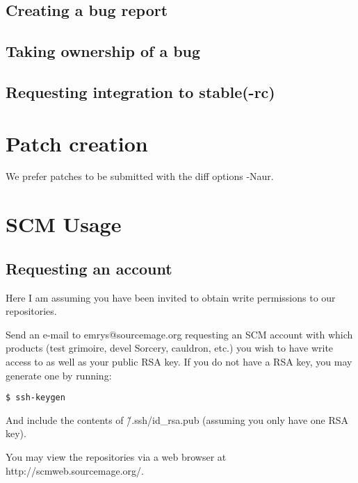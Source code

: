 \documentclass[a4paper,10pt]{book}
\begin{document}
\section{Creating a bug report}
\section{Taking ownership of a bug}
\section{Requesting integration to stable(-rc)}

\chapter{Patch creation}
We prefer patches to be submitted with the diff options -Naur.

\chapter{SCM Usage}
\section{Requesting an account}
Here I am assuming you have been invited to obtain write permissions to our
repositories.

Send an e-mail to emrys@sourcemage.org requesting an SCM account with which
products (test grimoire, devel Sorcery, cauldron, etc.) you wish to have
write access to as well as your public RSA key. If you do not have a RSA
key, you may generate one by running:

\begin{verbatim}
$ ssh-keygen
\end{verbatim}

And include the contents of \~/.ssh/id\_rsa.pub (assuming you only have one RSA
key).

You may view the repositories via a web browser at
http://scmweb.sourcemage.org/.
\end{document}

